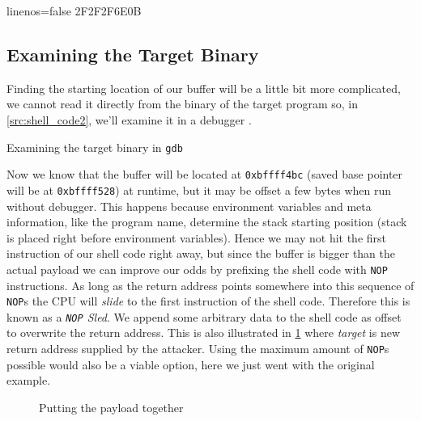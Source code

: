 \documentclass[article]{uibk}
\begin{document}
\begin{code*}{linenos=false}
    \x2F\x2F\x2F\x6E\x0B\xCD{}
\end{code*}

\subsection{Examining the Target Binary}

Finding the starting location of our buffer will be a little bit more
complicated, we cannot read it directly from the binary of the target program
so, in \cref{src:shell_code2}, we'll examine it in a debugger .

\begin{listing}[h!]
    \begin{minipage}[t]{0.4\textwidth}
    \end{minipage}\hfill
    \begin{minipage}[t]{0.5\textwidth}
    \end{minipage}
    \caption{Examining the target binary in \texttt{gdb}}
    \label{src:shell_code2}
\end{listing}

Now we know that the buffer will be located at \texttt{0xbffff4bc} (saved base
pointer will be at \texttt{0xbffff528}) at runtime, but it may be offset a few
bytes when run without debugger. This happens because environment variables and
meta information, like the program name, determine the stack starting position
(stack is placed right before environment variables). Hence we may not hit the
first instruction of our shell code right away, but since the buffer is bigger
than the actual payload we can improve our odds by prefixing the shell code
with \texttt{NOP} instructions. As long as the return address points somewhere
into this sequence of \texttt{NOP}s the CPU will \emph{slide} to the first
instruction of the shell code. Therefore this is known as a
\textit{\texttt{NOP} Sled}. We append some arbitrary data to the shell code as
offset to overwrite the return address. This is also illustrated in
\cref{fig:shell_code} where \textit{target} is new return address supplied by
the attacker. Using the maximum amount of \texttt{NOP}s possible would also be
a viable option, here we just went with the original example.

\begin{figure}[H]
    \centering
    
    \caption{Putting the payload together}
    \label{fig:shell_code}
\end{figure}
\end{document}
